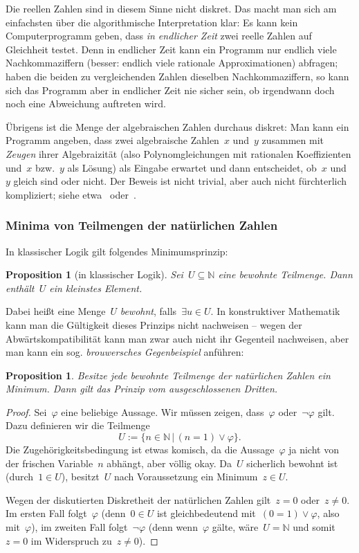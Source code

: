 \documentclass[a4paper,ngerman,12pt]{scrartcl}
\theoremstyle{definition}
\theoremstyle{plain}
\newtheorem{prop}[defn]{Proposition}
\theoremstyle{remark}
\newcommand{\NN}{\mathbb{N}}
\renewcommand{\_}{\mathpunct{.}\,}
\newcommand{\?}{\,{:}\,}
\begin{document}
Die reellen Zahlen sind in diesem Sinne nicht diskret. Das macht
man sich am einfachsten über die algorithmische Interpretation klar: Es kann
kein Computerprogramm geben, dass \emph{in endlicher Zeit} zwei reelle Zahlen
auf Gleichheit testet. Denn in endlicher Zeit kann ein Programm nur endlich viele
Nachkommaziffern (besser: endlich viele rationale Approximationen) abfragen;
haben die beiden zu vergleichenden Zahlen dieselben Nachkommaziffern, so kann
sich das Programm aber in endlicher Zeit nie sicher sein, ob irgendwann doch noch
eine Abweichung auftreten wird.

Übrigens ist die Menge der algebraischen Zahlen durchaus diskret:
Man kann ein
Programm angeben, dass zwei algebraische Zahlen~$x$ und~$y$ zusammen mit \emph{Zeugen}
ihrer Algebraizität (also Polynomgleichungen mit rationalen Koeffizienten
und~$x$ bzw.~$y$ als Lösung) als Eingabe erwartet und dann entscheidet, ob~$x$
und~$y$ gleich sind oder nicht. Der Beweis ist nicht trivial, aber auch nicht
fürchterlich kompliziert; siehe etwa~\cite[Prop.~1.6]{nw:algebra}
oder~\cite[Kapitel~VI.1, Seite~140]{mines:richman:ruitenburg}.


\subsubsection*{Minima von Teilmengen der natürlichen Zahlen}

In klassischer Logik gilt folgendes Minimumsprinzip:
\begin{prop}[in klassischer Logik]Sei~$U \subseteq \NN$ eine bewohnte
Teilmenge. Dann enthält~$U$ ein kleinstes Element.\end{prop}
Dabei heißt eine Menge~$U$ \emph{bewohnt}, falls~$\exists u \in U$.
In konstruktiver Mathematik kann man die Gültigkeit dieses Prinzips nicht nachweisen -- wegen der
Ab\-wärts\-kom\-pa\-ti\-bi\-li\-tät kann man zwar auch nicht ihr Gegenteil
nachweisen, aber man kann ein sog. \emph{brouwersches Gegenbeispiel}
anführen:
\begin{prop}Besitze jede bewohnte Teilmenge der natürlichen Zahlen ein Minimum.
Dann gilt das Prinzip vom ausgeschlossenen Dritten.\end{prop}
\begin{proof}Sei~$\varphi$ eine beliebige Aussage. Wir müssen zeigen,
dass~$\varphi$ oder~$\neg\varphi$ gilt. Dazu definieren wir die Teilmenge
\[ U := \{ n \in \NN \,|\, (n = 1) \vee \varphi \}. \]
Die Zugehörigkeitsbedingung ist etwas komisch, da die Aussage~$\varphi$ ja
nicht von der frischen Variable~$n$ abhängt, aber völlig okay. Da~$U$
sicherlich bewohnt ist (durch~$1 \in U$), besitzt~$U$ nach Voraussetzung ein
Minimum~$z \in U$.

Wegen der diskutierten Diskretheit der natürlichen Zahlen gilt~$z = 0$ oder~$z
\neq 0$. Im ersten Fall folgt~$\varphi$ (denn~$0 \in U$ ist gleichbedeutend
mit~$(0 = 1) \vee \varphi$, also mit~$\varphi$), im zweiten Fall folgt~$\neg\varphi$ (denn
wenn~$\varphi$ gälte, wäre~$U = \NN$ und somit~$z = 0$ im Widerspruch zu~$z
\neq 0$).\end{proof}
\end{document}

